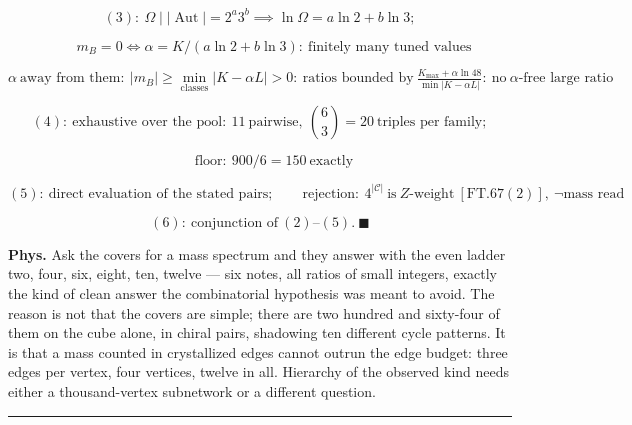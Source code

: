 \begin{theorem}
\[
(3):\ \Omega\mid|\operatorname{Aut}|=2^a3^b\implies\ln\Omega=a\ln2+b\ln3;
\]

\[
\qquad m_B=0\iff\alpha=K/(a\ln2+b\ln3):\ \text{finitely many tuned values}
\]

\[
\alpha\ \text{away from them}:\ |m_B|\ge\min_{\text{classes}}|K-\alpha L|>0:\ \text{ratios bounded by}\ \tfrac{K_{\max}+\alpha\ln48}{\min|K-\alpha L|}:\ \text{no}\ \alpha\text{-free large ratio}
\]

\[
(4):\ \text{exhaustive over the pool}:\ 11\ \text{pairwise},\ \binom63=20\ \text{triples per family};
\]

\[
\qquad \text{floor}:\ 900/6=150\ \text{exactly}
\]

\[
(5):\ \text{direct evaluation of the stated pairs};\qquad\text{rejection}:\ 4^{|\mathcal C|}\ \text{is}\ Z\text{-weight}\ [\mathrm{FT.67}(2)],\ \neg\text{mass read}
\]

\[
(6):\ \text{conjunction of}\ (2)\text{–}(5).\ \blacksquare
\]

\textbf{Phys.} Ask the covers for a mass spectrum and they answer with the even ladder two, four, six, eight, ten, twelve — six notes, all ratios of small integers, exactly the kind of clean answer the combinatorial hypothesis was meant to avoid. The reason is not that the covers are simple; there are two hundred and sixty-four of them on the cube alone, in chiral pairs, shadowing ten different cycle patterns. It is that a mass counted in crystallized edges cannot outrun the edge budget: three edges per vertex, four vertices, twelve in all. Hierarchy of the observed kind needs either a thousand-vertex subnetwork or a different question.

\vspace{2pt}\noindent\rule{\textwidth}{0.4pt}\vspace{2pt}

\end{theorem}

